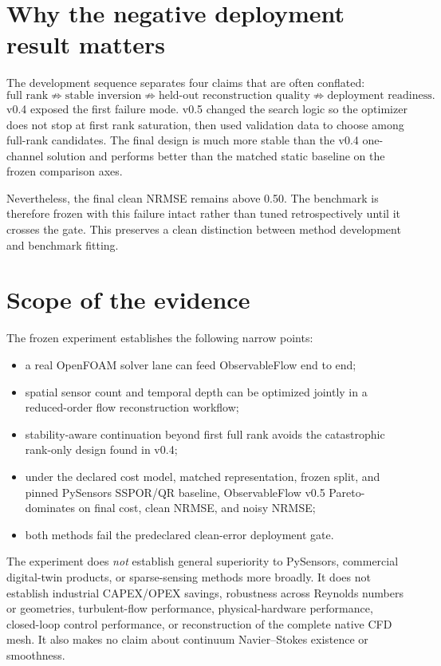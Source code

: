 \documentclass[11pt]{article}
\begin{document}
\section{Why the negative deployment result matters}
The development sequence separates four claims that are often conflated:
\begin{equation}
\text{full rank}\not\Rightarrow\text{stable inversion}\not\Rightarrow\text{held-out reconstruction quality}\not\Rightarrow\text{deployment readiness}.
\end{equation}
v0.4 exposed the first failure mode. v0.5 changed the search logic so the optimizer does not stop at first rank saturation, then used validation data to choose among full-rank candidates. The final design is much more stable than the v0.4 one-channel solution and performs better than the matched static baseline on the frozen comparison axes.

Nevertheless, the final clean NRMSE remains above 0.50. The benchmark is therefore frozen with this failure intact rather than tuned retrospectively until it crosses the gate. This preserves a clean distinction between method development and benchmark fitting.

\section{Scope of the evidence}
The frozen experiment establishes the following narrow points:
\begin{itemize}
\item a real OpenFOAM solver lane can feed ObservableFlow end to end;
\item spatial sensor count and temporal depth can be optimized jointly in a reduced-order flow reconstruction workflow;
\item stability-aware continuation beyond first full rank avoids the catastrophic rank-only design found in v0.4;
\item under the declared cost model, matched representation, frozen split, and pinned PySensors SSPOR/QR baseline, ObservableFlow v0.5 Pareto-dominates on final cost, clean NRMSE, and noisy NRMSE;
\item both methods fail the predeclared clean-error deployment gate.
\end{itemize}

The experiment does \emph{not} establish general superiority to PySensors, commercial digital-twin products, or sparse-sensing methods more broadly. It does not establish industrial CAPEX/OPEX savings, robustness across Reynolds numbers or geometries, turbulent-flow performance, physical-hardware performance, closed-loop control performance, or reconstruction of the complete native CFD mesh. It also makes no claim about continuum Navier--Stokes existence or smoothness.
\end{document}
